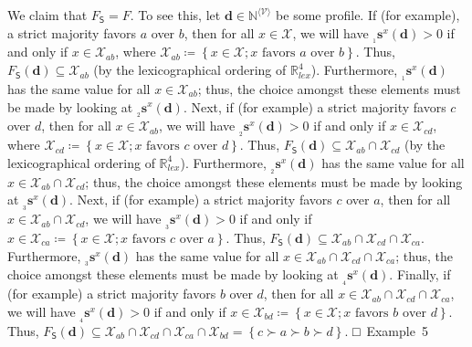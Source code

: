 \documentclass[
]{article}
\begin{document}
We claim that \(F_{\mathsf{S}} = F\). To see this, let
\(\mathbf{d} \in \mathbb{N}^{\langle\mathcal{V}\rangle}\) be some
profile. If (for example), a strict majority favors \(a\) over \(b\),
then for all \(x \in \mathcal{X}\), we will have
\({}_{{}_{1}}\mathbf{s}^{x}\left( \mathbf{d} \right) > 0\) if and only
if \(x \in \mathcal{X}_{ab}\), where
\(\mathcal{X}_{ab} ≔ \left\{ x \in \mathcal{X};x\text{~favors~}a\text{~over~}b \right\}\).
Thus,
\(F_{\mathsf{S}}\left( \mathbf{d} \right) \subseteq \mathcal{X}_{ab}\)
(by the lexicographical ordering of \(\mathbb{R}_{lex}^{4}\)).
Furthermore, \({}_{{}_{1}}\mathbf{s}^{x}\left( \mathbf{d} \right)\) has
the same value for all \(x \in \mathcal{X}_{ab}\); thus, the choice
amongst these elements must be made by looking at
\({}_{{}_{2}}\mathbf{s}^{x}\left( \mathbf{d} \right)\). Next, if (for
example) a strict majority favors \(c\) over \(d\), then for all
\(x \in \mathcal{X}_{ab}\), we will have
\({}_{{}_{2}}\mathbf{s}^{x}\left( \mathbf{d} \right) > 0\) if and only
if \(x \in \mathcal{X}_{cd}\), where
\(\mathcal{X}_{cd} ≔ \left\{ x \in \mathcal{X};x\text{~favors~}c\text{~over~}d \right\}\).
Thus,
\(F_{\mathsf{S}}\left( \mathbf{d} \right) \subseteq \mathcal{X}_{ab} \cap \mathcal{X}_{cd}\)
(by the lexicographical ordering of \(\mathbb{R}_{lex}^{4}\)).
Furthermore, \({}_{{}_{2}}\mathbf{s}^{x}\left( \mathbf{d} \right)\) has
the same value for all \(x \in \mathcal{X}_{ab} \cap \mathcal{X}_{cd}\);
thus, the choice amongst these elements must be made by looking at
\({}_{{}_{3}}\mathbf{s}^{x}\left( \mathbf{d} \right)\). Next, if (for
example) a strict majority favors \(c\) over \(a\), then for all
\(x \in \mathcal{X}_{ab} \cap \mathcal{X}_{cd}\), we will have
\({}_{{}_{3}}\mathbf{s}^{x}\left( \mathbf{d} \right) > 0\) if and only
if
\(x \in \mathcal{X}_{ca} ≔ \left\{ x \in \mathcal{X}; x\text{~favors~}c\text{~over~}a \right\}\).
Thus,
\(F_{\mathsf{S}}\left( \mathbf{d} \right) \subseteq \mathcal{X}_{ab} \cap \mathcal{X}_{cd} \cap \mathcal{X}_{ca}\).
Furthermore, \({}_{{}_{3}}\mathbf{s}^{x}\left( \mathbf{d} \right)\) has
the same value for all
\(x \in \mathcal{X}_{ab} \cap \mathcal{X}_{cd} \cap \mathcal{X}_{ca}\);
thus, the choice amongst these elements must be made by looking at
\({}_{{}_{4}}\mathbf{s}^{x}\left( \mathbf{d} \right)\). Finally, if (for
example) a strict majority favors \(b\) over \(d\), then for all
\(x \in \mathcal{X}_{ab} \cap \mathcal{X}_{cd} \cap \mathcal{X}_{ca}\),
we will have \({}_{{}_{4}}\mathbf{s}^{x}\left( \mathbf{d} \right) > 0\)
if and only if
\(x \in \mathcal{X}_{bd} ≔ \left\{ x \in \mathcal{X};x\text{~favors~}b\text{~over~}d \right\}\).
Thus,
\(F_{\mathsf{S}}\left( \mathbf{d} \right) \subseteq \mathcal{X}_{ab} \cap \mathcal{X}_{cd} \cap \mathcal{X}_{ca} \cap \mathcal{X}_{bd} = \left\{ c \succ a \succ b \succ d \right\}\).
□~Example~5
\end{document}

